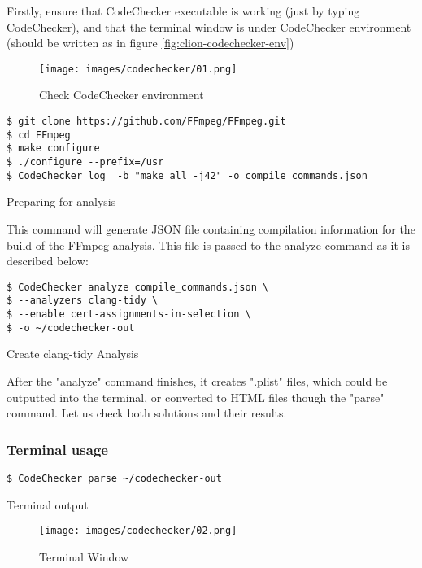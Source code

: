 Firstly, ensure that CodeChecker executable is working (just by typing CodeChecker), and that the terminal window is under CodeChecker environment (should be written as in figure \ref{fig:clion-codechecker-env})

\begin{figure}[H]
	\centering
        \caption{Check CodeChecker environment}
	\texttt{[image: images/codechecker/01.png]}
	\label{fig:codechecker-env}
\end{figure}

\begin{listing}[H]
\begin{verbatim}
$ git clone https://github.com/FFmpeg/FFmpeg.git
$ cd FFmpeg
$ make configure
$ ./configure --prefix=/usr
$ CodeChecker log  -b "make all -j42" -o compile_commands.json
\end{verbatim}
\caption{Preparing for analysis}
\end{listing}

This command will generate JSON file containing compilation information for the build of the FFmpeg analysis. This file is passed to the analyze command as it is described below:

\begin{listing}[H]
\begin{verbatim}
$ CodeChecker analyze compile_commands.json \
$ --analyzers clang-tidy \
$ --enable cert-assignments-in-selection \
$ -o ~/codechecker-out
\end{verbatim}
\caption{Create clang-tidy Analysis}
\end{listing}

After the "analyze" command finishes, it creates ".plist" files, which could be outputted into the terminal, or converted to HTML files though the "parse" command. Let us check both solutions and their results. 

\subsubsection{Terminal usage} 
    
\begin{listing}[H]
\begin{verbatim}
$ CodeChecker parse ~/codechecker-out
\end{verbatim}
\caption{Terminal output}
\end{listing}

\begin{figure}[H]
\centering
    \caption{Terminal Window}
\texttt{[image: images/codechecker/02.png]}
\label{fig:codechecker-term}
\end{figure}
    
